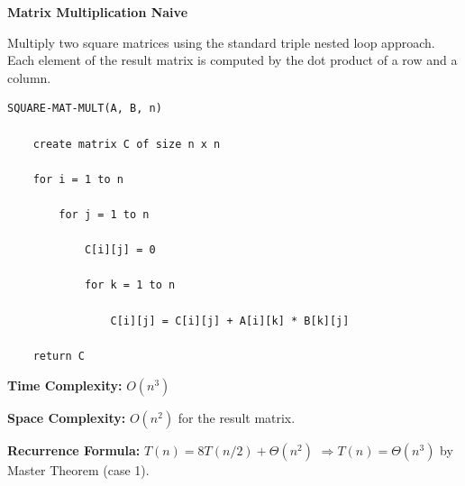 \documentclass[a4paper,12pt]{article}
\begin{document}
\begin{tcolorbox}[
    colback=gray!30,
    colframe=black,
    boxrule=1pt,
    arc=0mm
]

\begin{tcolorbox}[
    colback=gray!10,
    colframe=black,
    arc=0mm
]
\centering
{\Huge\bfseries Matrix Multiplication Naive}
\end{tcolorbox}


\begin{tcolorbox}[
    colback=gray!10,
    colframe=black,
    arc=0mm
]
\small
Multiply two square matrices using the standard triple nested loop approach.
Each element of the result matrix is computed by the dot product of a row and a column.
\end{tcolorbox}


\begin{tcolorbox}[
    colback=black!5,
    colframe=black,
    arc=0mm,
    title=Pseudo-code
]
\tiny
\begin{lstlisting}
SQUARE-MAT-MULT(A, B, n)

    create matrix C of size n x n

    for i = 1 to n

        for j = 1 to n

            C[i][j] = 0

            for k = 1 to n

                C[i][j] = C[i][j] + A[i][k] * B[k][j]

    return C
\end{lstlisting}
\end{tcolorbox}


\begin{tcolorbox}[
    colback=cyan!20,
    colframe=black,
    arc=0mm
]
\small
\textbf{Time Complexity:}
$O(n^3)$
\end{tcolorbox}


\begin{tcolorbox}[
    colback=violet!20,
    colframe=black,
    arc=0mm
]
\small
\textbf{Space Complexity:}
$O(n^2)$ for the result matrix.
\end{tcolorbox}


\begin{tcolorbox}[
    colback=pink!20,
    colframe=black,
    arc=0mm
]
\small
\textbf{Recurrence Formula:}
$T(n)=8T(n/2)+\Theta(n^2)$
$\Rightarrow T(n)=\Theta(n^3)$ by Master Theorem (case 1).
\end{tcolorbox}

\end{tcolorbox}
\end{document}
